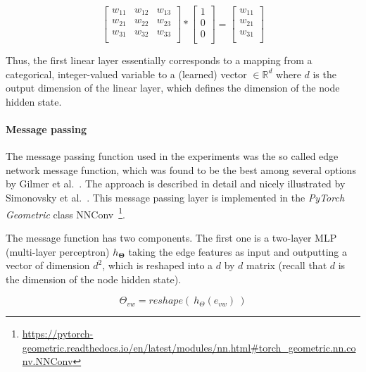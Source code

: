 \begin{equation}
\begin{bmatrix} 
w_{11} & w_{12} & w_{13} \\
w_{21} & w_{22} & w_{23} \\
w_{31} & w_{32} & w_{33} \\
\end{bmatrix}
*
\begin{bmatrix} 
1 \\
0 \\
0 \\
\end{bmatrix}
=
\begin{bmatrix} 
w_{11} \\
w_{21} \\
w_{31} \\
\end{bmatrix}
\end{equation}

Thus, the first linear layer essentially corresponds to a mapping from a categorical, integer-valued variable to a (learned) vector $\in \mathbb{R}^d$ where $d$ is the output dimension of the linear layer, which defines the dimension of the node hidden state.

\paragraph{Message passing}

The message passing function used in the experiments was the so called edge network message function, which was found to be the best among several options by Gilmer et al.~\cite{Gilmer2017}. The approach is described in detail and nicely illustrated by Simonovsky et al.~\cite{Simonovsky2017}. This message passing layer is implemented in the \textit{PyTorch Geometric} class NNConv~\footnote{\url{https://pytorch-geometric.readthedocs.io/en/latest/modules/nn.html\#torch_geometric.nn.conv.NNConv}}\label{fn:pytorch-geometric-nn-docs}.


The message function has two components. The first one is a two-layer MLP (multi-layer perceptron)  $h_{\mathbf{\Theta}}$ taking the edge features as input and outputting a vector of dimension $d^2$, which is reshaped into a $d$ by $d$ matrix (recall that $d$ is the dimension of the node hidden state).

\begin{equation}
	\Theta_{vw} = reshape(~h_{\Theta}(e_{vw})~)
\end{equation}

